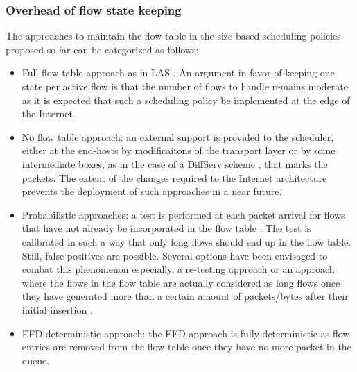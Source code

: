 \documentclass[preprint,12pt]{elsarticle}
\begin{document}
\subsubsection{Overhead of flow state keeping}\label{sec:table_size}
The approaches to maintain the flow table in the size-based scheduling policies proposed so far can be categorized as follows: %
\begin{itemize}
 \item Full flow table approach as in LAS \cite{Rai04size-basedscheduling}. An argument in favor of keeping one state per active flow is that the number of flows to handle remains moderate as it is expected that such a scheduling policy be implemented at the edge of the Internet.
\item No flow table approach: an external support is provided to the scheduler, either at the end-hosts by modificaitons of the transport layer \cite{Avrachenkov04Run2c} or by some intermediate boxes, as in the case of a DiffServ scheme \cite{Noureddine02improvingthe}, that marks the packets. The extent of the changes required to the Internet architecture prevents the deployment of such approaches in a near future.
\item Probabilistic approaches:  a test is performed at each packet arrival for flows that have not already be incorporated in the flow table \cite{DivakaranCAP10,Kortebi04Xprotect,Psounis05Sift}. The test is calibrated in such a way that only long flows should end up in the flow table. Still, false positives are possible. Several options have been envisaged to combat this phenomenon especially, a re-testing approach \cite{Psounis05Sift} or an approach where the flows in the flow table are actually considered as long flows once they have generated more than a certain amount of packets/bytes after their initial insertion \cite{DivakaranCAP10}.
\item EFD deterministic approach:  the EFD approach is fully deterministic as flow entries are removed from the flow table once they have no more packet in the queue. 
\end{itemize}
\end{document}
